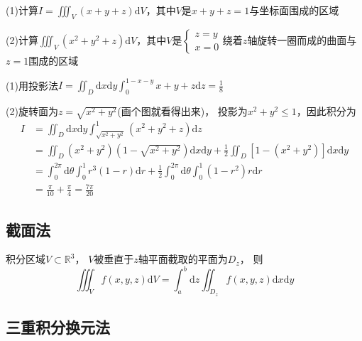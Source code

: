 ~

\begin{exercise}[投影法]
  (1)计算$I = \iiint_V(x+y+z)\mathrm{d} V$，其中$V$是$x+y+z = 1$与坐标面围成的区域

  (2)计算$\iiint_V (x^2 + y^2 + z)\mathrm{d}V$，其中$V$是$
  \begin{cases}
    z = y\\
    x = 0
  \end{cases}
  $绕着$z$轴旋转一圈而成的曲面与$z = 1$围成的区域
\end{exercise}

\begin{solution}
  (1)用投影法$I = \iint_D \mathrm{d} x \mathrm{d} y \int_0^{1 - x- y}x+y+z \mathrm{d} z = \frac{1}{8}$

  (2)旋转面为$z = \sqrt{x^2 + y^2}$(画个图就看得出来)，
  投影为$x^2 + y^2 \leq 1$，因此积分为
  \begin{align*}
    I &= \iint_D \mathrm{d} x \mathrm{d} y \int_{\sqrt{x^2 + y^2}}^1 (x^2 + y^2 + z)\mathrm{d} z \\
    &= \iint_D (x^2 + y^2)(1 - \sqrt{x^2 + y^2})\mathrm{d} x\mathrm{d} y + \frac{1}{2}\iint_D [1 - (x^2 + y^2)]\mathrm{d} x\mathrm{d} y\\
    &= \int_0^{2\pi} \mathrm{d} \theta \int_0^1 r^3 (1 - r)\mathrm{d} r + \frac{1}{2} \int_0^{2\pi}\mathrm{d} \theta \int_0^1 (1 - r^2)r\mathrm{d}r\\ 
    &= \frac{\pi}{10} + \frac{\pi}{4} = \frac{7\pi}{20}
  \end{align*}
\end{solution}

\subsection{截面法}

\begin{theorem}[截面法]
  积分区域$V \subset \mathbb{R}^3$，
  $V$被垂直于$z$轴平面截取的平面为$D_z$，
  则
  \begin{equation*}
    \iiint _Vf(x,y,z) \mathrm{d}V = \int ^b_a \mathrm{d}z \iint _{D_z}f(x,y,z)\mathrm{d}x\mathrm{d}y
  \end{equation*}
\end{theorem}

\subsection{三重积分换元法}

